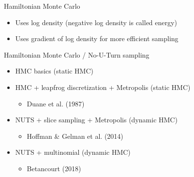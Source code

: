\documentclass[finnish,english,t]{beamer}
\begin{document}
\begin{frame}{Hamiltonian Monte Carlo}

  \vspace{-0.5\baselineskip}
  \begin{itemize}
  \item Uses log density (negative log density is called energy)
  \item Uses gradient of log density for more efficient sampling
  \end{itemize}
  \vspace{-0.6\baselineskip}
\end{frame}

\begin{frame}{Hamiltonian Monte Carlo / No-U-Turn sampling}

  \begin{itemize}
  \item<+->[1.] HMC basics (static HMC)
  \item<+->[2.] HMC + leapfrog discretization + Metropolis (static HMC)
    \begin{itemize}
    \item Duane et al. (1987)
    \end{itemize}
  \item<+->[3.] NUTS + slice sampling + Metropolis (dynamic HMC)
    \begin{itemize}
    \item Hoffman \& Gelman et al. (2014)
    \end{itemize}
  \item<+->[4.] NUTS + multinomial (dynamic HMC)
    \begin{itemize}
    \item Betancourt (2018)
    \end{itemize}
  \end{itemize}

\end{frame}
\end{document}
